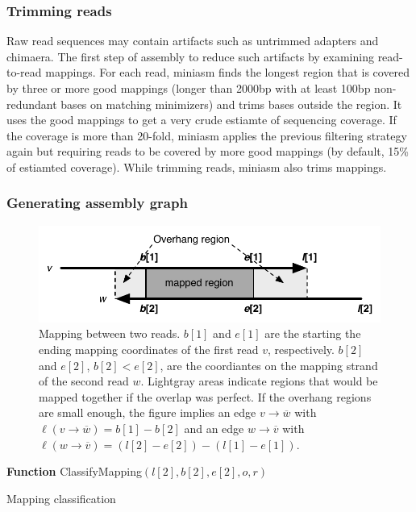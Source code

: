 \documentclass{bioinfo}
\begin{document}
\begin{methods}
\subsubsection{Trimming reads}

Raw read sequences may contain artifacts such as untrimmed adapters and
chimaera. The first step of assembly to reduce such artifacts by examining
read-to-read mappings. For each read, miniasm finds the longest region that is
covered by three or more good mappings (longer than 2000bp with at least 100bp
non-redundant bases on matching minimizers) and trims bases outside the region.
It uses the good mappings to get a very crude estiamte of sequencing coverage.
If the coverage is more than 20-fold, miniasm applies the previous filtering
strategy again but requiring reads to be covered by more good mappings (by
default, 15\% of estiamted coverage). While trimming reads, miniasm also trims
mappings.

\subsubsection{Generating assembly graph}

\begin{figure}[ht]
\centering
\includegraphics[width=.45\textwidth]{overhang}
\caption{Mapping between two reads. $b[1]$ and $e[1]$ are the starting the
ending mapping coordinates of the first read $v$, respectively. $b[2]$ and
$e[2]$, $b[2]<e[2]$, are the coordiantes on the mapping strand of the second
read $w$. Lightgray areas indicate regions that would be mapped together if the
overlap was perfect. If the overhang regions are small enough, the figure
implies an edge $v\to\overline{w}$ with $\ell(v\to\overline{w})=b[1]-b[2]$ and
an edge $w\to\overline{v}$ with
$\ell(w\to\overline{v})=(l[2]-e[2])-(l[1]-e[1])$.}\label{fig:overhang}
\end{figure}

\begin{algorithm}[ht]
\DontPrintSemicolon
\footnotesize
{}
\BlankLine
\textbf{Function} {\sc ClassifyMapping}$(l[2], b[2], e[2], o, r)$
\caption{Mapping classification}
\end{algorithm}


\end{methods}
\end{document}
